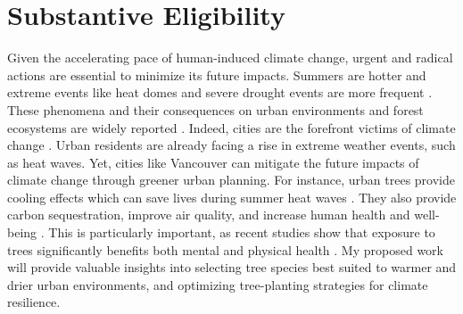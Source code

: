 \documentclass[11pt,letter]{article}
\begin{document}
\section *{Substantive Eligibility} 
Given the accelerating pace of human-induced climate change, urgent and radical actions are essential to minimize its future impacts. Summers are hotter and extreme events like heat domes and severe drought events are more frequent \citep{zhang_increased_2023}. These phenomena and their consequences on urban environments and forest ecosystems are widely reported \citep{allen_global_2010, mccarthy_climate_2010}. Indeed, cities are the forefront victims of climate change \citep{das_unraveling_2024, corburn_cities_2009}. Urban residents are already facing a rise in extreme weather events, such as heat waves\citep{das_unraveling_2024}. Yet, cities like Vancouver can mitigate the future impacts of climate change through greener urban planning. For instance, urban trees provide cooling effects which can save lives during summer heat waves \citep{ettinger_street_2024, zandler_cooling_2024}. They also provide carbon sequestration, improve air quality, and increase human health and well-being \citep{wolf_urban_2020}. This is particularly important, as recent studies show that exposure to trees significantly benefits both mental and physical health  \citep{wolf_urban_2020, turnerskoff_benefits_2019}. My proposed work will provide valuable insights into selecting tree species best suited to warmer and drier urban environments, and optimizing tree-planting strategies for climate resilience. %
\end{document}
